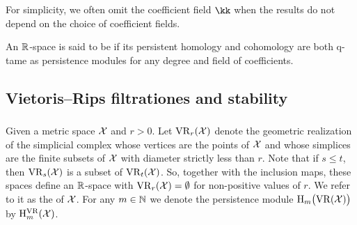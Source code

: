 For simplicity, we often omit the coefficient field $\kk$ when the results do not depend on the choice of coefficient fields.

An $\mathbb{R}$-space is said to be  if its persistent homology and cohomology are both q-tame as persistence modules for any degree and field of coefficients.

%
%
%

\subsection{Vietoris--Rips filtrationes and stability}

\subsubsection{}

Given a metric space $\mathcal{X}$ and $r > 0$.
Let $\mathrm{VR}_r(\mathcal{X})$ denote the geometric realization of the simplicial complex whose vertices are the points of $\mathcal{X}$ and whose simplices are the finite subsets of $\mathcal{X}$ with diameter strictly less than $r$.
Note that if $s \leq t$, then $\mathrm{VR}_s(\mathcal{X})$ is a subset of $\mathrm{VR}_t(\mathcal{X})$.
So, together with the inclusion maps, these spaces define an $\mathbb{R}$-space with $\mathrm{VR}_r(\mathcal{X}) = \emptyset$ for non-positive values of $r$.
We refer to it as the  of $\mathcal{X}$.
For any \(m \in \mathbb{N}\) we denote the persistence module \(\mathrm{H}_m\big(\mathrm{VR}(\mathcal{X})\big)\) by \(\mathrm{H}_m^{\mathrm{VR}}(\mathcal{X})\).


